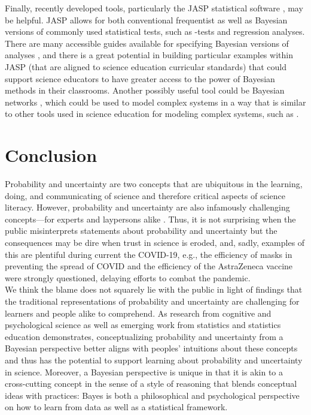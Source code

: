 \documentclass[man]{apa7}
\begin{document}
Finally, recently developed tools, particularly the JASP statistical software \parencite{JASP2020}, may be helpful. JASP allows for both conventional frequentist as well as Bayesian versions of commonly used statistical tests, such as -tests and regression analyses. There are many accessible guides available for specifying Bayesian versions of analyses \parencite{v20, wagenmakers2018bayesian}, and there is a great potential in building particular examples within JASP (that are aligned to science education curricular standards) that could support science educators to have greater access to the power of Bayesian methods in their classrooms. Another possibly useful tool could be Bayesian networks \parencite[e.g., ][]{bayesbox}, which could be used to model complex systems in a way that is similar to other tools used in science education for modeling complex systems, such as \textcite{20}.

\section{Conclusion}

Probability and uncertainty are two concepts that are ubiquitous in the learning, doing, and communicating of science and therefore critical aspects of science literacy. However, probability and uncertainty are also infamously challenging concepts—for experts and laypersons alike \parencite{gkv04, s07, tk74}. Thus, it is not surprising when the public misinterprets statements about probability and uncertainty but the consequences may be dire when trust in science is eroded, and, sadly, examples of this are plentiful during current the COVID-19, e.g., the efficiency of masks in preventing the spread of COVID and the efficiency of the AstraZeneca vaccine were strongly questioned, delaying efforts to combat the pandemic. \\

We think the blame does not squarely lie with the public in light of findings that the traditional representations of probability and uncertainty are challenging for learners and people alike to comprehend. As research from cognitive and psychological science as well as emerging work from statistics and statistics education demonstrates, conceptualizing probability and uncertainty from a Bayesian perspective better aligns with peoples’ intuitions \parencite{kl18, so12, jeffreys1961} about these concepts and thus has the potential to support learning about probability and uncertainty in science. Moreover, a Bayesian perspective is unique in that it is akin to a cross-cutting concept in the sense of a style of reasoning \parencite{so12, ork18} that blends conceptual ideas with practices: Bayes is both a philosophical and psychological perspective on how to learn from data as well as a statistical framework. 
\end{document}
